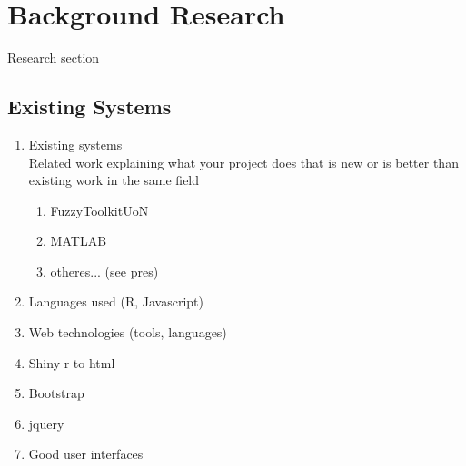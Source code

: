 \section{Background Research}

Research section

\subsection{Existing Systems}
\label{sec:existing-systems}

\begin{enumerate}
\item Existing systems\\
{\color{red} Related work explaining what your project does that is new or is better than existing work in the same field}
	\begin{enumerate}
		\item FuzzyToolkitUoN
		\item MATLAB
		\item otheres... (see pres)
	\end{enumerate}
\item Languages used (R, Javascript)
\item Web technologies (tools, languages)
\item Shiny r to html
\item Bootstrap
\item jquery
\item Good user interfaces
\end{enumerate}

